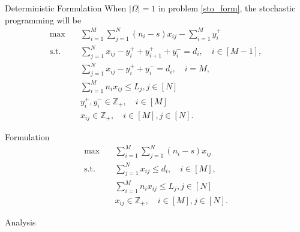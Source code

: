 \begin{frame}{Deterministic Formulation}
  When $|\Omega| =1$ in problem \eqref{sto_form}, the stochastic programming will be 
  \small
  \begin{equation}\label{one_form}
    \begin{aligned}
    \max \quad & \sum_{i=1}^{M}  \sum_{j= 1}^{N} (n_i-s) x_{ij} - \sum_{i=1}^{M} y_{i}^{+}  \\
    \text {s.t.} \quad & \sum_{j= 1}^{N} x_{ij} - y_{i}^{+}+ y_{i+1}^{+} + y_{i}^{-} = d_{i}, \quad i \in [M-1], \\
    & \sum_{j= 1}^{N} x_{ij} -y_{i}^{+} + y_{i}^{-} = d_{i}, \quad i = M, \\
    & \sum_{i=1}^{M} n_{i} x_{ij} \leq L_j, j \in [N]\\
    & y_{i}^{+}, y_{i}^{-} \in \mathbb{Z}_{+}, \quad i \in [M] \\
    & x_{ij} \in \mathbb{Z}_{+}, \quad i \in [M], j \in [N].
    \end{aligned}
  \end{equation}
\end{frame}

\begin{frame}{Formulation}
  \begin{equation}\label{deter_upper}
    \begin{aligned}
    \max \quad & \sum_{i=1}^{M}  \sum_{j= 1}^{N} (n_i- s) x_{ij} \\
    \text {s.t.} \quad & \sum_{j= 1}^{N} x_{ij} \leq d_{i}, \quad i \in [M], \\
    & \sum_{i=1}^{M} n_{i} x_{ij} \leq L_j, j \in [N] \\
    & x_{ij} \in \mathbb{Z}_{+}, \quad i \in [M], j \in [N].
    \end{aligned}
  \end{equation}
\end{frame}

\begin{frame}{Analysis}

\end{frame}

